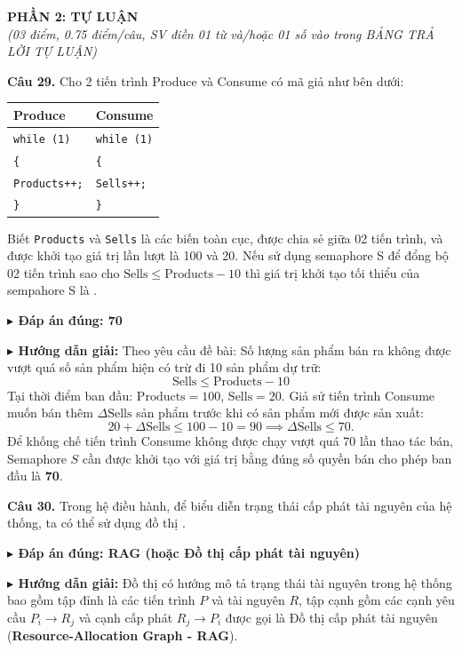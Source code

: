 \documentclass[11pt,a4paper]{article}
\newcommand{\giaithich}[2]{%
    \par\vspace{0.15cm}\noindent
    \begingroup\small
    \noindent\textbf{\color{blue}$\blacktriangleright$ Đáp án đúng: #1} \par\vspace{0.08cm}
    \noindent\textbf{\color{teal}$\blacktriangleright$ Hướng dẫn giải:} #2
    \endgroup\par\vspace{0.35cm}
}
\begin{document}
\vspace{0.4cm}

\noindent\textbf{\large PHẦN 2: TỰ LUẬN}\\
\textit{(03 điểm, 0.75 điểm/câu, SV điền 01 từ và/hoặc 01 số vào trong BẢNG TRẢ LỜI TỰ LUẬN)}

\vspace{0.3cm}
\noindent\textbf{Câu 29.} Cho 2 tiến trình Produce và Consume có mã giả như bên dưới:
\begin{center}
\begin{tabular}{|p{}|p{}|}
\hline
\textbf{Produce} & \textbf{Consume} \\ \hline
\texttt{while (1)} & \texttt{while (1)} \\
\texttt{\{} & \texttt{\{} \\
\quad \texttt{Products++;} & \quad \texttt{Sells++;} \\
\texttt{\}} & \texttt{\}} \\ \hline
\end{tabular}
\end{center}
Biết \texttt{Products} và \texttt{Sells} là các biến toàn cục, được chia sẻ giữa 02 tiến trình, và được khởi tạo giá trị lần lượt là 100 và 20. Nếu sử dụng semaphore S để đổng bộ 02 tiến trình sao cho $\text{Sells} \le \text{Products} - 10$ thì giá trị khởi tạo tối thiểu của sempahore S là \underline{\hspace{2.5cm}}.
\giaithich{70}{Theo yêu cầu đề bài: Số lượng sản phẩm bán ra không được vượt quá số sản phẩm hiện có trừ đi 10 sản phẩm dự trữ:
$$\text{Sells} \le \text{Products} - 10$$
Tại thời điểm ban đầu: $\text{Products} = 100$, $\text{Sells} = 20$.
Giả sử tiến trình Consume muốn bán thêm $\Delta\text{Sells}$ sản phẩm trước khi có sản phẩm mới được sản xuất:
$$20 + \Delta\text{Sells} \le 100 - 10 = 90 \implies \Delta\text{Sells} \le 70.$$
Để khống chế tiến trình Consume không được chạy vượt quá 70 lần thao tác bán, Semaphore $S$ cần được khởi tạo với giá trị bằng đúng số quyền bán cho phép ban đầu là \textbf{70}.}

\vspace{0.2cm}
\noindent\textbf{Câu 30.} Trong hệ điều hành, để biểu diễn trạng thái cấp phát tài nguyên của hệ thống, ta có thể sử dụng đồ thị \underline{\hspace{4cm}}.
\giaithich{RAG (hoặc Đồ thị cấp phát tài nguyên)}{Đồ thị có hướng mô tả trạng thái tài nguyên trong hệ thống bao gồm tập đỉnh là các tiến trình $P$ và tài nguyên $R$, tập cạnh gồm các cạnh yêu cầu $P_i \to R_j$ và cạnh cấp phát $R_j \to P_i$ được gọi là Đồ thị cấp phát tài nguyên (\textbf{Resource-Allocation Graph - RAG}).}
\end{document}
